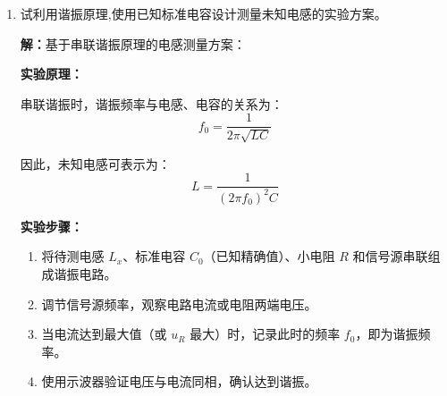 \documentclass[12pt,a4paper]{article}
\begin{document}
\begin{enumerate}
\begin{enumerate}[label=(\arabic*)]
        电容的实际容量可能与标称值有偏差，电容的容值也会随温度和频率变化。
        
        \item \textbf{分布参数影响：}
        
        电路中存在分布电容和分布电感，特别是导线、电感线圈的分布电容会使实际谐振频率降低。
        
        \item \textbf{电感线圈损耗：}
        
        电感的等效串联电阻 $R_L$ 会影响谐振频率，特别是当 $R_L$ 较大时，实际谐振频率为：
        \[ f_0' = f_0 \sqrt{1 - \dfrac{R_L^2 C}{L}} < f_0 \]
        
        \item \textbf{测量误差：}
        
        频率测量仪器的精度限制、读数误差等。
        
        \item \textbf{负载效应：}
        
        测量仪器（如示波器探头）的输入阻抗和电容会影响电路参数。
    \end{enumerate}
    
    \textbf{改进建议：}使用精密仪器测量元件实际参数，考虑分布参数影响，使用修正公式计算。
    
    \item 试利用谐振原理,使用已知标准电容设计测量未知电感的实验方案。
    
    \textbf{解：}基于串联谐振原理的电感测量方案：
    
    \textbf{实验原理：}
    
    串联谐振时，谐振频率与电感、电容的关系为：
    \[ f_0 = \dfrac{1}{2\pi\sqrt{LC}} \]
    
    因此，未知电感可表示为：
    \[ L = \dfrac{1}{(2\pi f_0)^2 C} \]
    
    \textbf{实验步骤：}
    
    \begin{enumerate}[label=\arabic*.]
        \item 将待测电感 $L_x$、标准电容 $C_0$（已知精确值）、小电阻 $R$ 和信号源串联组成谐振电路。
        
        \item 调节信号源频率，观察电路电流或电阻两端电压。
        
        \item 当电流达到最大值（或 $u_R$ 最大）时，记录此时的频率 $f_0$，即为谐振频率。
        
        \item 使用示波器验证电压与电流同相，确认达到谐振。
        

\end{enumerate}
\end{enumerate}
\end{document}
